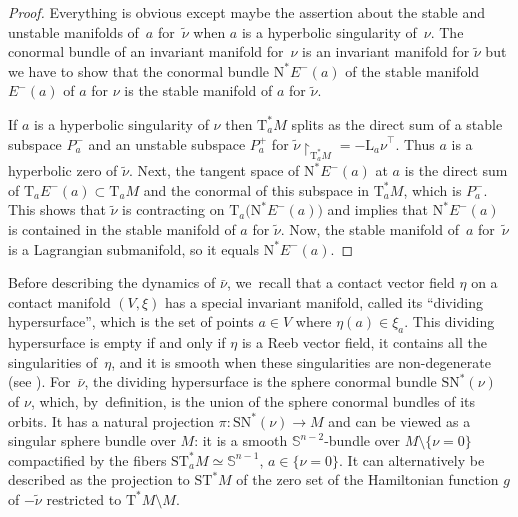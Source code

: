 \documentclass[JEP,XML,SOM,Unicode]{cedram}
\newcommand{\bS}{{\mathbb S}}
\newcommand{\sN}{\mathrm{N}^\ast}
\newcommand{\sSN}{\mathrm{SN}^\ast}
\newcommand{\sT}{\mathrm{T}^\ast}
\newcommand{\sST}{\mathrm{ST}^\ast}
\newcommand{\rT}{\mathrm{T}}
\newcommand{\hnu}{\tilde\nu}
\newcommand{\cnu}{\bar\nu}
\def\Lnu_#1{{\mathrm L_#1\nu}}
\newcommand{\rst}[1]{{\upharpoonright}_{\!#1}}
\let\on\colon
\theoremstyle{plain}
\theoremstyle{definition}
\begin{document}
\begin{proof}
Everything is obvious except maybe the assertion about the stable and unstable
manifolds of~$a$ for~$\hnu$ when $a$ is a hyperbolic singularity of~$\nu$. The
conormal bundle of an invariant manifold for~$\nu$ is an invariant manifold for
$\hnu$ but we have to show that the conormal bundle $\sN E^-(a)$ of the stable
manifold $E^-(a)$ of $a$ for $\nu$ is the stable manifold of $a$ for $\hnu$.

If $a$ is a hyperbolic singularity of $\nu$ then $\sT_aM$ splits as the direct
sum of a stable subspace $P_a^-$ and an unstable subspace $P_a^+$ for $\hnu \rst
{ \sT_aM } = -\Lnu_a^\top$. Thus $a$ is a hyperbolic zero of $\hnu$. Next, the
tangent space of $\sN E^-(a)$ at $a$ is the direct sum of $\rT_aE^-(a) \subset
\rT_aM$ and the conormal of this subspace in $\sT_aM$, which is $P_a^-$. This
shows that $\hnu$ is contracting on $\rT_a \bigl(\sN E^-(a)\bigr)$ and implies
that $\sN E^-(a)$ is contained in the stable manifold of $a$ for $\hnu$. Now,
the stable manifold of~$a$ for~$\hnu$ is a Lagrangian submanifold, so it equals
$\sN E^-(a)$.
\end{proof}

Before describing the dynamics of $\cnu$, we~recall that a contact vector field
$\eta$ on a contact manifold $(V,\xi)$ has a special invariant manifold, called
its ``dividing hypersurface'', which is the set of points $a \in V$ where $\eta
(a) \in \xi_a$. This dividing hypersurface is empty if and only if $\eta$ is a
Reeb vector field, it contains all the singularities of~$\eta$, and it is smooth
when these singularities are non-degenerate (see \cite{Gi}). For~$\cnu$, the
dividing hypersurface is the sphere conormal bundle $\sSN(\nu)$ of $\nu$, which, by~definition, is the union of the sphere conormal bundles of its orbits. It has
a natural projection $\pi \on \sSN(\nu) \to M$ and can be viewed as a singular
sphere bundle over $M$: it is a smooth $\bS^{n-2}$-bundle over $M \setminus \{\nu=0\}$
compactified by the fibers $\sST_aM \simeq \bS^{n-1}$, $a \in \{\nu=0\}$. It can
alternatively be described as the projection to $\sST M$ of the zero set of the
Hamiltonian function $g$ of $-\hnu$ restricted to $\sT M \setminus M$.
\end{document}
